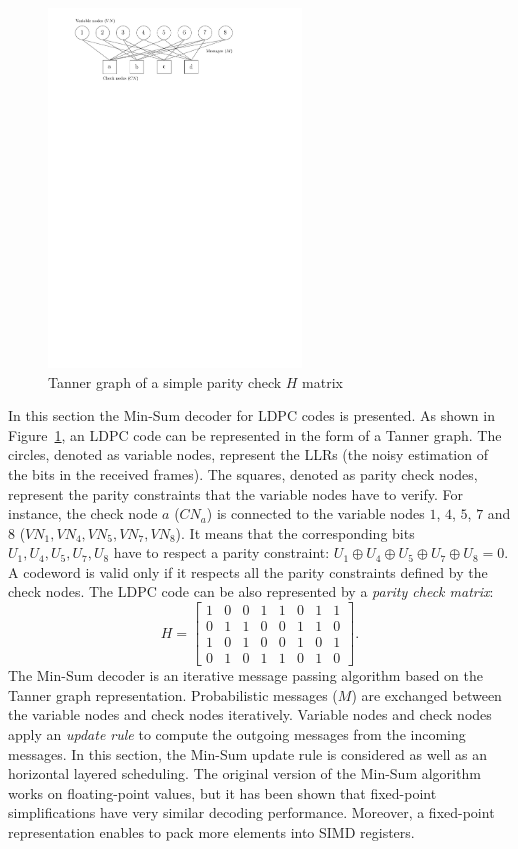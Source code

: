 \begin{figure}
  \centering
  \includegraphics[width=0.60\textwidth]{ldpc/ldpc_tanner_graph}
  \caption{Tanner graph of a simple parity check $H$ matrix}
  \label{fig:LDPC}
\end{figure}

In this section the Min-Sum decoder for LDPC codes is presented. As shown in
Figure~\ref{fig:LDPC}, an LDPC code can be represented in the form of a Tanner
graph. The circles, denoted as variable nodes, represent the LLRs (the noisy
estimation of the bits in the received frames). The squares, denoted as parity
check nodes, represent the parity constraints that the variable nodes have to
verify. For instance, the check node $a$ ($CN_a$) is connected to the variable
nodes $1$, $4$, $5$, $7$ and $8$ ($VN_1, VN_4, VN_5, VN_7, VN_8$). It means that
the corresponding bits $U_1, U_4, U_5, U_7, U_8$ have to respect a parity
constraint: $U_1 \oplus U_4 \oplus U_5 \oplus U_7 \oplus U_8 = 0$. A codeword is
valid only if it respects all the parity constraints defined by the check nodes.
The LDPC code can be also represented by a \textit{parity check matrix}:
{ \begin{equation*}
H =
\begin{bmatrix}
  1&0&0&1&1&0&1&1\\
  0&1&1&0&0&1&1&0\\
  1&0&1&0&0&1&0&1\\
  0&1&0&1&1&0&1&0
\end{bmatrix}.
\end{equation*}
}
The Min-Sum decoder is an iterative message passing algorithm based on the
Tanner graph representation. Probabilistic messages ($M$) are exchanged between
the variable nodes and check nodes iteratively. Variable nodes and check nodes
apply an \textit{update rule} to compute the outgoing messages from the incoming
messages. In this section, the Min-Sum update rule is considered as well as an
horizontal layered scheduling. The original version of the Min-Sum algorithm
works on floating-point values, but it has been shown that fixed-point
simplifications have very similar decoding performance. Moreover, a fixed-point
representation enables to pack more elements into SIMD registers.

